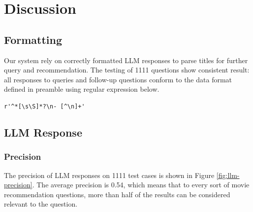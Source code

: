 \documentclass[journal]{IEEEtran}
\theoremstyle{mydefstyle}
\begin{document}

\section{Discussion}

\subsection{Formatting} 

Our system rely on correctly formatted LLM responses to parse titles for further query and recommendation. The testing of 1111 questions show consistent result: all responses to queries and follow-up questions conform to the data format defined in preamble using regular expression below.

\begin{center}
    \verb|r'^*[\s\S]*?\n- [^\n]+'|
\end{center}

\subsection{LLM Response}
\subsubsection{Precision}
The precision of LLM responses on 1111 test cases is shown in Figure \ref{fig:llm-precision}. The average precision is 0.54, which means that to every sort of movie recommendation questions, more than half of the results can be considered relevant to the question.
\end{document}

